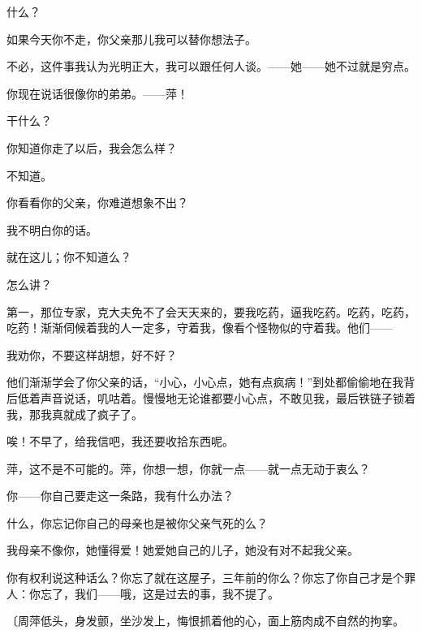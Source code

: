 什么？

如果今天你不走，你父亲那儿我可以替你想法子。

不必，这件事我认为光明正大，我可以跟任何人谈。——她——她不过就是穷点。

你现在说话很像你的弟弟。——萍！

干什么？

你知道你走了以后，我会怎么样？

不知道。

你看看你的父亲，你难道想象不出？

我不明白你的话。

就在这儿；你不知道么？

怎么讲？

第一，那位专家，克大夫免不了会天天来的，要我吃药，逼我吃药。吃药，吃药，吃药！渐渐伺候着我的人一定多，守着我，像看个怪物似的守着我。他们——

我劝你，不要这样胡想，好不好？

他们渐渐学会了你父亲的话，“小心，小心点，她有点疯病！”到处都偷偷地在我背后低着声音说话，叽咕着。慢慢地无论谁都要小心点，不敢见我，最后铁链子锁着我，那我真就成了疯子了。

唉！不早了，给我信吧，我还要收拾东西呢。

萍，这不是不可能的。萍，你想一想，你就一点——就一点无动于衷么？

你——你自己要走这一条路，我有什么办法？

什么，你忘记你自己的母亲也是被你父亲气死的么？

我母亲不像你，她懂得爱！她爱她自己的儿子，她没有对不起我父亲。

你有权利说这种话么？你忘了就在这屋子，三年前的你么？你忘了你自己才是个罪人：你忘了，我们——哦，这是过去的事，我不提了。

{\fangsong〔周萍低头，身发颤，坐沙发上，悔恨抓着他的心，面上筋肉成不自然的拘挛。}

